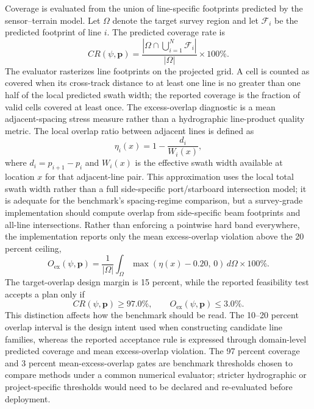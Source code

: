 \documentclass[jmse,article,submit,moreauthors]{Definitions/mdpi}
\begin{document}
Coverage is evaluated from the union of line-specific footprints predicted by the sensor--terrain model. Let $\Omega$ denote the target survey region and let $\mathcal{F}_i$ be the predicted footprint of line $i$. The predicted coverage rate is
\begin{equation}
CR(\psi,\mathbf{p})
=
\frac{\left|\Omega \cap \bigcup_{i=1}^{N}\mathcal{F}_i\right|}{|\Omega|}\times 100\%.
\end{equation}
The evaluator rasterizes line footprints on the projected grid. A cell is counted as covered when its cross-track distance to at least one line is no greater than one half of the local predicted swath width; the reported coverage is the fraction of valid cells covered at least once. The excess-overlap diagnostic is a mean adjacent-spacing stress measure rather than a hydrographic line-product quality metric. The local overlap ratio between adjacent lines is defined as
\begin{equation}
\eta_i(x)=1-\frac{d_i}{W_i(x)},
\end{equation}
where $d_i=p_{i+1}-p_i$ and $W_i(x)$ is the effective swath width available at location $x$ for that adjacent-line pair. This approximation uses the local total swath width rather than a full side-specific port/starboard intersection model; it is adequate for the benchmark's spacing-regime comparison, but a survey-grade implementation should compute overlap from side-specific beam footprints and all-line intersections. Rather than enforcing a pointwise hard band everywhere, the implementation reports only the mean excess-overlap violation above the 20 percent ceiling,
\begin{equation}
O_{\mathrm{ex}}(\psi,\mathbf{p})
=
\frac{1}{|\Omega|}\int_{\Omega}\max\!\left(\eta(x)-0.20,\,0\right)\,d\Omega \times 100\%.
\end{equation}
The target-overlap design margin is 15 percent, while the reported feasibility test accepts a plan only if
\begin{equation}
CR(\psi,\mathbf{p}) \ge 97.0\%, \qquad O_{\mathrm{ex}}(\psi,\mathbf{p}) \le 3.0\%.
\end{equation}
This distinction affects how the benchmark should be read. The 10--20 percent overlap interval is the design intent used when constructing candidate line families, whereas the reported acceptance rule is expressed through domain-level predicted coverage and mean excess-overlap violation. The 97 percent coverage and 3 percent mean-excess-overlap gates are benchmark thresholds chosen to compare methods under a common numerical evaluator; stricter hydrographic or project-specific thresholds would need to be declared and re-evaluated before deployment.
\end{document}
